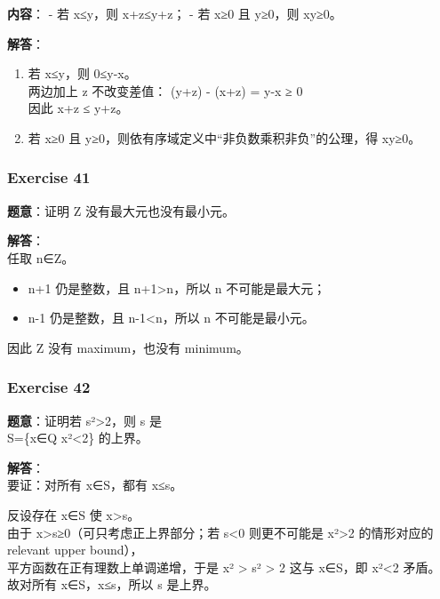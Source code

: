 \documentclass[
  11pt,
]{article}
\providecommand{\tightlist}{%
  \setlength{\itemsep}{0pt}\setlength{\parskip}{0pt}}
\begin{document}
\textbf{内容}： - 若 x≤y，则 x+z≤y+z； - 若 x≥0 且 y≥0，则 xy≥0。

\textbf{解答}：

\begin{enumerate}
\def\labelenumi{\arabic{enumi}.}
\item
  若 x≤y，则 0≤y-x。\\
  两边加上 z 不改变差值： (y+z) - (x+z) = y-x ≥ 0\\
  因此 x+z ≤ y+z。
\item
  若 x≥0 且 y≥0，则依有序域定义中``非负数乘积非负''的公理，得 xy≥0。
\end{enumerate}

\subsubsection{Exercise 41}\label{exercise-41}

\textbf{题意}：证明 Z 没有最大元也没有最小元。

\textbf{解答}：\\
任取 n∈Z。

\begin{itemize}
\tightlist
\item
  n+1 仍是整数，且 n+1\textgreater n，所以 n 不可能是最大元；
\item
  n-1 仍是整数，且 n-1\textless n，所以 n 不可能是最小元。
\end{itemize}

因此 Z 没有 maximum，也没有 minimum。

\subsubsection{Exercise 42}\label{exercise-42}

\textbf{题意}：证明若 s²\textgreater2，则 s 是\\
S=\{x∈Q \textbar{} x²\textless2\} 的上界。

\textbf{解答}：\\
要证：对所有 x∈S，都有 x≤s。

反设存在 x∈S 使 x\textgreater s。\\
由于 x\textgreater s≥0（可只考虑正上界部分；若 s\textless0 则更不可能是
x²\textgreater2 的情形对应的 relevant upper bound），\\
平方函数在正有理数上单调递增，于是 x² \textgreater{} s² \textgreater{} 2
这与 x∈S，即 x²\textless2 矛盾。\\
故对所有 x∈S，x≤s，所以 s 是上界。
\end{document}

